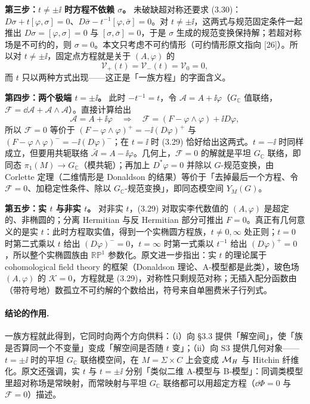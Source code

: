\textbf{第三步：$t\ne\pm\ii$ 时方程不依赖 $\sigma$。} 未破缺超对称还要求 (3.30)：$D\sigma+t[\varphi,\sigma]=0$、$D\bar\sigma-t^{-1}[\varphi,\bar\sigma]=0$。对 $t\ne\pm\ii$，这两式与规范固定条件一起推出 $D\sigma=[\varphi,\sigma]=0$ 与 $[\sigma,\bar\sigma]=0$，于是 $\sigma$ 生成的规范变换保持解；若超对称场是不可约的，则 $\sigma=0$\pA{}。本文只考虑不可约情形（可约情形原文指向 [26]）。所以对 $t\ne\pm\ii$，固定点方程就是关于 $(A,\varphi)$ 的
\begin{equation}
\mathcal V_+(t)=\mathcal V_-(t)=\mathcal V_0=0,
\label{eq:fixedBPS}
\end{equation}
而 $t$ 只以两种方式出现——这正是「一族方程」的字面含义。

\textbf{第四步：两个极端 $t=\pm\ii$。} 此时 $-t^{-1}=t$，令 $\mathcal A=A+\ii\varphi$（$G_{\mathbb C}$ 值联络，$\mathcal F=\dd\mathcal A+\mathcal A\wedge\mathcal A$）。直接计算给出
\begin{equation}
\mathcal A=A+\ii\varphi
\quad\Longrightarrow\quad
\mathcal F=(F-\varphi\wedge\varphi)+\ii D\varphi,
\label{eq:FcalA}
\end{equation}
所以 $\mathcal F=0$ 等价于 $(F-\varphi\wedge\varphi)^{+}=-\ii(D\varphi)^{+}$ 与 $(F-\varphi\wedge\varphi)^{-}=-\ii(D\varphi)^{-}$；在 $t=\ii$ 时 (3.29) 恰好给出这两式。$t=-\ii$ 时同样成立，但要用共轭联络 $\bar{\mathcal A}=A-\ii\varphi$\pB{}。几何上，$\mathcal F=0$ 的解就是平坦 $G_{\mathbb C}$ 联络，即同态 $\pi_1(M)\to G_{\mathbb C}$（模共轭）；再加上 $D^*\varphi=0$ 并除以 $G$-规范变换，由 Corlette 定理（二维情形是 Donaldson 的结果）等价于「去掉最后一个方程、令 $\mathcal F=0$、加稳定性条件、除以 $G_{\mathbb C}$-规范变换」，即同态模空间 $Y_M(G)$\pA{}。

\textbf{第五步：实 $t$ 与非实 $t$。} 对非实 $t$，(3.29) 对取实李代数值的 $(A,\varphi)$ 是超定的、非椭圆的；分离 Hermitian 与反 Hermitian 部分可推出 $F=0$。真正有几何意义的是实 $t$：此时方程取实值，得到一个实椭圆方程族，$t\ne0,\infty$ 处正则；$t=0$ 时第二式乘以 $t$ 给出 $(D\varphi)^{-}=0$，$t=\infty$ 时第一式乘以 $t^{-1}$ 给出 $(D\varphi)^{+}=0$，所以整个实椭圆族由 $\mathbb{RP}^1$ 参数化\pA{}。原文进一步指出：实 $t$ 的理论属于 cohomological field theory 的框架（Donaldson 理论、A-模型都是此类），玻色场 $(A,\varphi)$ 的 $\mathcal K=0$，方程就是 (3.29)，对称性只剩规范对称；无插入配分函数由（带符号地）数孤立不可约解的个数给出，符号来自单圈费米子行列式\pA{}。

\paragraph{结论的作用.}
一族方程就此得到，它同时向两个方向供料：（i）向 §3.3 提供「解空间」，使「族是否算同一个不变量」变成「解空间是否随 $t$ 变」；（ii）向 S3 提供几何对象——$t=\pm\ii$ 时的平坦 $G_{\mathbb C}$ 联络模空间，在 $M=\Sigma\times C$ 上会变成 $\mathcal{M}_H$ 与 Hitchin 纤维化\pA{}。原文还强调，实 $t$ 与 $t=\pm\ii$ 分别「类似二维 A-模型与 B-模型」：同调类模型里超对称场是常映射，而常映射与平坦 $G_{\mathbb C}$ 联络都可以用超定方程（$\dd\Phi=0$ 与 $\mathcal F=0$）描述\pA{}。

